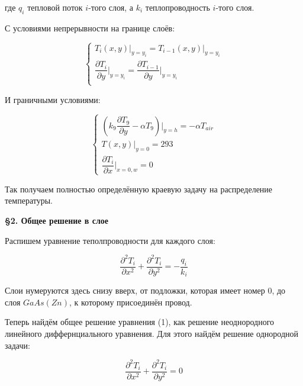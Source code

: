 \documentclass[a4paper,12pt]{article}
\begin{document}
	\begin{center}
		где $q_i$ тепловой поток $i$-того слоя, а $k_i$ теплопроводность $i$-того слоя. 
	\end{center}
	
	\quad С условиями непрерывности на границе слоёв:
	
	\begin{equation}
		\begin{cases}
			T_i(x, y)\bigg|_{y=y_i} = T_{i-1}(x, y)\bigg|_{y=y_i} \\
			\dfrac{\partial T_i}{\partial y} \bigg|_{y=y_i} = \dfrac{\partial T_{i-1}}{\partial y}\bigg|_{y=y_i} \\
		\end{cases}
	\end{equation}
	
	\quad И граничными условиями: 
	
	\begin{equation}
		\begin{cases}
			\left( k_9\dfrac{\partial T_9}{\partial y} - \alpha T_9\right)\bigg|_{y=h} = -\alpha T_{air} \\
			T(x, y) \bigg|_{y=0} = 293 \\
			\dfrac{\partial T_i}{\partial x} \bigg|_{x=0,w} = 0
		\end{cases}
	\end{equation}
	
	\quad Так получаем полностью определённую краевую задачу на распределение температуры. 
	
	\quad 	\textbf{ \S 2. Общее решение в слое}
	
	\quad Распишем уравнение теполпроводности для каждого слоя:
	
	\begin{equation}
		\frac{\partial^2 T_i}{\partial x^2} + \dfrac{\partial^2 T_i}{\partial y^2} = -\dfrac{q_i}{k_i}
	\end{equation}

	\quad Слои нумеруются здесь снизу вверх, от подложки, которая имеет номер 0, до слоя $GaAs(Zn)$, к которому присоединён провод.
	
	\quad Теперь найдём общее решение уравнения (1), как решение неоднородного линейного диффернциального уравнения. Для этого найдём решение однородной задачи:
	
	\begin{equation}
		\dfrac{\partial^2 T_i}{\partial x^2} + \dfrac{\partial^2 T_i}{\partial y^2} = 0
	\end{equation}
	
\end{document}

